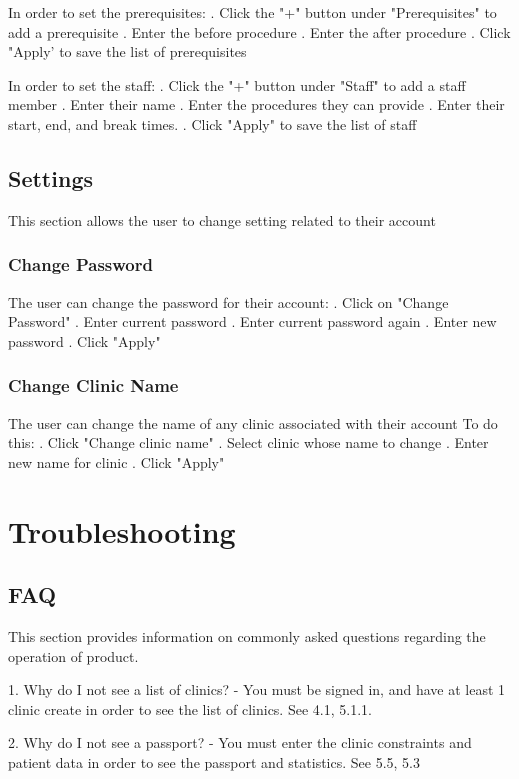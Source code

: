 \documentclass[12pt]{article}
\begin{document}
In order to set the prerequisites:
. Click the "+" button under "Prerequisites" to add a prerequisite
. Enter the before procedure
. Enter the after procedure
. Click "Apply' to save the list of prerequisites
\medbreak

In order to set the staff:
. Click the "+" button under "Staff" to add a staff member
. Enter their name
. Enter the procedures they can provide
. Enter their start, end, and break times.
. Click "Apply" to save the list of staff

\subsection{Settings}
This section allows the user to change setting related to their account

\subsubsection{Change Password}
The user can change the password for their account:
. Click on "Change Password"
. Enter current password
. Enter current password again
. Enter new password
. Click "Apply"

\subsubsection{Change Clinic Name}
The user can change the name of any clinic associated with their account
To do this:
. Click "Change clinic name"
. Select clinic whose name to change
. Enter new name for clinic
. Click "Apply"

\section{Troubleshooting}
\subsection{FAQ}
This section provides information on commonly asked questions regarding the operation of product.
\medbreak

1. Why do I not see a list of clinics?
- You must be signed in, and have at least 1 clinic create in order to see the list of clinics. See 4.1, 5.1.1.
\medbreak

2. Why do I not see a passport?
- You must enter the clinic constraints and patient data in order to see the passport and statistics. See 5.5, 5.3
\end{document}
